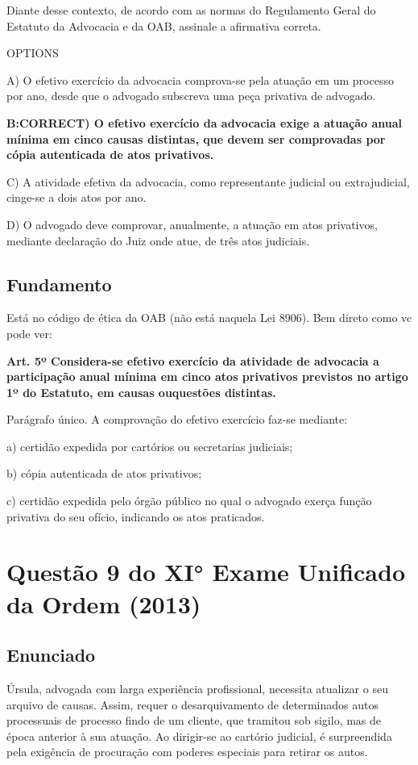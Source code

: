 \documentclass[12pt]{article}
\begin{document}
Diante desse contexto, de acordo com as normas do 
Regulamento Geral do Estatuto da Advocacia e da OAB, 
assinale a afirmativa correta. 
 
OPTIONS

A) O efetivo exercício da advocacia comprova-se pela atuação 
em um processo por ano, desde que o advogado subscreva 
uma peça privativa de advogado. 

\textbf{B:CORRECT) O efetivo exercício da advocacia exige a atuação anual mínima em cinco causas distintas, que devem ser 
comprovadas por cópia autenticada de atos privativos. }

C) A atividade efetiva da advocacia, como representante 
judicial ou extrajudicial, cinge-se a dois atos por ano. 

D) O advogado deve comprovar, anualmente, a atuação em 
atos privativos, mediante declaração do Juiz onde atue, de 
três atos judiciais.

\subsection{Fundamento}

Está no código de ética da OAB (não está naquela Lei 8906). Bem direto como vc pode ver:

\textbf{Art. 5º Considera-se efetivo exercício da atividade de advocacia a participação anual mínima em cinco atos privativos previstos no artigo 1º do Estatuto, em causas ouquestões distintas.}

Parágrafo único. A comprovação do efetivo exercício faz-se mediante:

a) certidão expedida por cartórios ou secretarias judiciais;

b) cópia autenticada de atos privativos;

c) certidão expedida pelo órgão público no qual o advogado exerça função privativa do seu ofício, indicando os atos praticados.

\section{Questão 9 do XI° Exame Unificado da Ordem (2013)}

\subsection{Enunciado}

Úrsula, advogada com larga experiência profissional, necessita 
atualizar o seu arquivo de causas. Assim, requer o 
desarquivamento de determinados autos processuais de 
processo findo de um cliente, que tramitou sob sigilo, mas de 
época anterior à sua atuação. Ao dirigir-se ao cartório judicial, 
é surpreendida pela exigência de procuração com poderes 
especiais para retirar os autos.  
\end{document}
